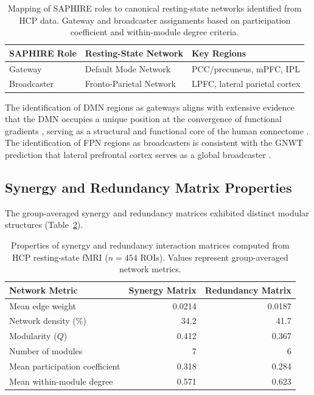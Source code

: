 \documentclass[11pt]{article}
\begin{document}
\begin{table}[H]
\centering
\caption{Mapping of SAPHIRE roles to canonical resting-state networks identified from HCP data. Gateway and broadcaster assignments based on participation coefficient and within-module degree criteria.}
\label{tab:mapping}
\begin{tabular}{lll}
\toprule
\textbf{SAPHIRE Role} & \textbf{Resting-State Network} & \textbf{Key Regions} \\
\midrule
Gateway & Default Mode Network & PCC/precuneus, mPFC, IPL \\
Broadcaster & Fronto-Parietal Network & LPFC, lateral parietal cortex \\
\bottomrule
\end{tabular}
\end{table}

The identification of DMN regions as gateways aligns with extensive evidence that the DMN occupies a unique position at the convergence of functional gradients \citep{margulies2016situating}, serving as a structural and functional core of the human connectome \citep{buckner2008brain}. The identification of FPN regions as broadcasters is consistent with the GNWT prediction that lateral prefrontal cortex serves as a global broadcaster \citep{dehaene2011experimental, cole2013multi}.

\subsection{Synergy and Redundancy Matrix Properties}

The group-averaged synergy and redundancy matrices exhibited distinct modular structures (Table~\ref{tab:matrix_props}).

\begin{table}[H]
\centering
\caption{Properties of synergy and redundancy interaction matrices computed from HCP resting-state fMRI ($n = 454$ ROIs). Values represent group-averaged network metrics.}
\label{tab:matrix_props}
\begin{tabular}{lrr}
\toprule
\textbf{Network Metric} & \textbf{Synergy Matrix} & \textbf{Redundancy Matrix} \\
\midrule
Mean edge weight & 0.0214 & 0.0187 \\
Network density (\%) & 34.2 & 41.7 \\
Modularity ($Q$) & 0.412 & 0.367 \\
Number of modules & 7 & 6 \\
Mean participation coefficient & 0.318 & 0.284 \\
Mean within-module degree & 0.571 & 0.623 \\
\bottomrule
\end{tabular}
\end{table}
\end{document}

